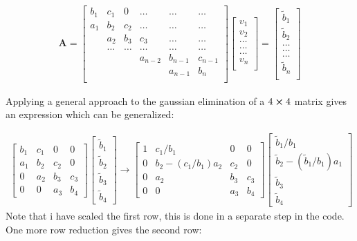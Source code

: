 \documentclass[12pt,norsk,a4paper]{article}
\begin{document}
\begin{align*}
	\mathbf{A} = \begin{bmatrix}
	b_1& c_1 & 0 &\dots   & \dots &\dots \\
	a_1 & b_2 & c_2 &\dots &\dots &\dots \\
	& a_2 & b_3 & c_3 & \dots & \dots \\
	& \dots   & \dots &\dots   &\dots & \dots \\
	&   &  &a_{n-2}  &b_{n-1}& c_{n-1} \\
	&    &  &   &a_{n-1} & b_n \\
	\end{bmatrix}\begin{bmatrix}
	v_1\\
	v_2\\
	\dots \\
	\dots  \\
	\dots \\
	v_n\\
	\end{bmatrix}
	=\begin{bmatrix}
	\tilde{b}_1\\
	\tilde{b}_2\\
	\dots \\
	\dots \\
	\dots \\
	\tilde{b}_n\\
	\end{bmatrix}
\end{align*}

Applying a general approach to the gaussian elimination of a $4\cross4$ matrix gives an expression which can be generalized:

\begin{align*}
\begin{bmatrix}
b_1 & c_1 & 0 & 0 \\ 
a_1 & b_2 & c_2 & 0 \\ 
0 & a_2 & b_3 & c_3 \\ 
0 & 0 & a_3 & b_4
\end{bmatrix}\begin{bmatrix}
\tilde{b}_1 \\ 
\tilde{b}_2 \\ 
\tilde{b}_3 \\ 
\tilde{b}_4
\end{bmatrix}\to
\begin{bmatrix}
1 & c_1/b_1 & 0 & 0 \\ 
0 & b_2-(c_1/b_1)a_2 & c_2 & 0 \\ 
0 & a_2 & b_3 & c_3 \\ 
0 & 0 & a_3 & b_4
\end{bmatrix}\begin{bmatrix}
\tilde{b}_1/b_1 \\ 
\tilde{b}_2-(\tilde{b}_1/b_1)a_1 \\ 
\tilde{b}_3 \\ 
\tilde{b}_4
\end{bmatrix}
\end{align*}
Note that i have scaled the first row, this is done in a separate step in the code. One more row reduction gives the second row:
\end{document}
